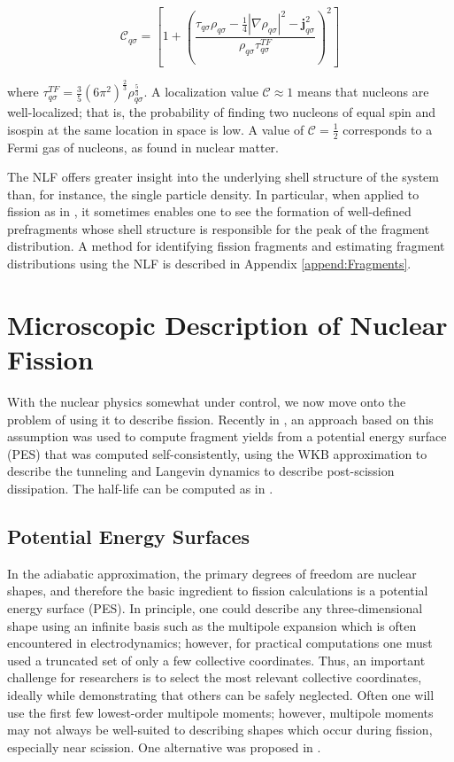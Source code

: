 \begin{equation}
\mathcal{C}_{q\sigma} = \left[1+\left(\frac{\tau_{q\sigma}\rho_{q\sigma}-\frac{1}{4}|\nabla\rho_{q\sigma}|^2-\mathbf{j}^2_{q\sigma}}{\rho_{q\sigma}\tau_{q\sigma}^{TF}}\right)^2\right]
\end{equation}

\noindent where $\tau_{q\sigma}^{TF}=\frac{3}{5}(6\pi^2)^\frac{2}{3}\rho_{q\sigma}^\frac{5}{3}$. A localization value $\mathcal{C} \approx 1$ means that nucleons are well-localized; that is, the probability of finding two nucleons of equal spin and isospin at the same location in space is low. A value of $\mathcal{C}=\frac{1}{2}$ corresponds to a Fermi gas of nucleons, as found in nuclear matter.

The NLF offers greater insight into the underlying shell structure of the system than, for instance, the single particle density. In particular, when applied to fission as in \cite{Sadhukhan2017}, it sometimes enables one to see the formation of well-defined prefragments whose shell structure is responsible for the peak of the fragment distribution. A method for identifying fission fragments and estimating fragment distributions using the NLF is described in Appendix \ref{append:Fragments}.

\section{Microscopic Description of Nuclear Fission}
With the nuclear physics somewhat under control, we now move onto the problem of using it to describe fission. Recently in \cite{Sadhukhan2016}, an approach based on this assumption was used to compute fragment yields from a potential energy surface (PES) that was computed self-consistently, using the WKB approximation to describe the tunneling and Langevin dynamics to describe post-scission dissipation. The half-life can be computed as in \cite{Sadhukhan2013}.

\subsection{Potential Energy Surfaces}
In the adiabatic approximation, the primary degrees of freedom are nuclear shapes, and therefore the basic ingredient to fission calculations is a potential energy surface (PES). In principle, one could describe any three-dimensional shape using an infinite basis such as the multipole expansion which is often encountered in electrodynamics; however, for practical computations one must used a truncated set of only a few collective coordinates. Thus, an important challenge for researchers is to select the most relevant collective coordinates, ideally while demonstrating that others can be safely neglected. Often one will use the first few lowest-order multipole moments; however, multipole moments may not always be well-suited to describing shapes which occur during fission, especially near scission. One alternative was proposed in \cite{Younes2012}.


